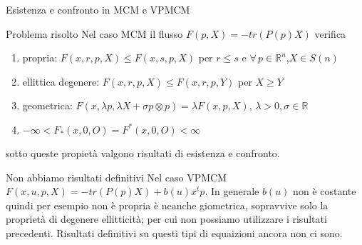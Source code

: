 \begin{frame}{Esistenza e confronto in MCM e VPMCM}
  \begin{block}{Problema risolto}
    Nel caso MCM il flusso $F(p,X)=-tr(P(p)X)$ verifica
    \begin{enumerate}
    \item \alert{propria}: $F(x,r,p,X)\leq F(x,s,p,X)$ per $r\leq
      s$ e $\forall\,p\in\mathbb{R}^n$,$X\in S(n)$
    \item \alert{ellittica degenere}: $F(x,r,p,X)\leq
      F(x,r,p,Y)$ per $X\geq Y$
    \item \alert{geometrica}: $F(x,\lambda p,\lambda X+\sigma
      p\otimes p)=\lambda F(x,p,X)$, $\lambda >0,\sigma\in\mathbb{R}$
      \item $-\infty<F_*(x,0,O)=F^*(x,0,O)<\infty$
    \end{enumerate}
    sotto queste propietà valgono risultati di esistenza e confronto.
  \end{block}
  \begin{block}{Non abbiamo risultati definitivi}
    Nel caso VPMCM $F(x,u,p,X)=-tr(P(p)X)+b(u)x^tp$. In generale
    $b(u)$ non è costante quindi per esempio non è
    \alert{propria} è neanche \alert{giometrica}, sopravvive solo la
    proprietà di \alert{degenere ellitticità}; per cui  non possiamo
    utilizzare i risultati precedenti. Risultati definitivi su
    questi tipi di equaizioni ancora non ci sono.
  \end{block}
\end{frame}
